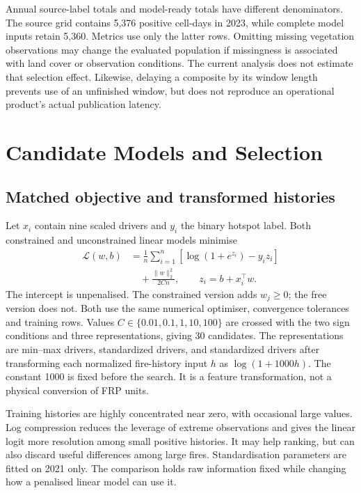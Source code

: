 \documentclass[conference]{IEEEtran}
\begin{document}
Annual source-label totals and model-ready totals have different denominators. The source grid contains 5,376 positive cell-days in 2023, while complete model inputs retain 5,360. Metrics use only the latter rows. Omitting missing vegetation observations may change the evaluated population if missingness is associated with land cover or observation conditions. The current analysis does not estimate that selection effect. Likewise, delaying a composite by its window length prevents use of an unfinished window, but does not reproduce an operational product's actual publication latency.


\section{Candidate Models and Selection}
\subsection{Matched objective and transformed histories}
Let $x_i$ contain nine scaled drivers and $y_i$ the binary hotspot label. Both constrained and unconstrained linear models minimise
\begin{equation}
\begin{aligned}
 \mathcal L(w,b)&=\frac1n\sum_{i=1}^{n}\left[\log(1+e^{z_i})-y_i z_i\right]\\
 &\quad+\frac{\lVert w\rVert_2^2}{2Cn},\qquad z_i=b+x_i^\top w.
\end{aligned}
\end{equation}
The intercept is unpenalised. The constrained version adds $w_j\geq0$; the free version does not. Both use the same numerical optimiser, convergence tolerances and training rows. Values $C\in\{0.01,0.1,1,10,100\}$ are crossed with the two sign conditions and three representations, giving 30 candidates. The representations are min--max drivers, standardized drivers, and standardized drivers after transforming each normalized fire-history input $h$ as $\log(1+1000h)$. The constant 1000 is fixed before the search. It is a feature transformation, not a physical conversion of FRP units.

Training histories are highly concentrated near zero, with occasional large values. Log compression reduces the leverage of extreme observations and gives the linear logit more resolution among small positive histories. It may help ranking, but can also discard useful differences among large fires. Standardisation parameters are fitted on 2021 only. The comparison holds raw information fixed while changing how a penalised linear model can use it.
\end{document}
